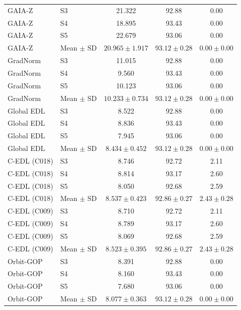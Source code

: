 \begin{longtable}{@{}llccc@{}}
GAIA-Z & S3 & 21.322 & 92.88 & 0.00 \\
GAIA-Z & S4 & 18.895 & 93.43 & 0.00 \\
GAIA-Z & S5 & 22.679 & 93.06 & 0.00 \\
GAIA-Z & Mean $\pm$ SD & $20.965 \pm 1.917$ & $93.12 \pm 0.28$ & $0.00 \pm 0.00$ \\
GradNorm & S3 & 11.015 & 92.88 & 0.00 \\
GradNorm & S4 & 9.560 & 93.43 & 0.00 \\
GradNorm & S5 & 10.123 & 93.06 & 0.00 \\
GradNorm & Mean $\pm$ SD & $10.233 \pm 0.734$ & $93.12 \pm 0.28$ & $0.00 \pm 0.00$ \\
Global EDL & S3 & 8.522 & 92.88 & 0.00 \\
Global EDL & S4 & 8.836 & 93.43 & 0.00 \\
Global EDL & S5 & 7.945 & 93.06 & 0.00 \\
Global EDL & Mean $\pm$ SD & $8.434 \pm 0.452$ & $93.12 \pm 0.28$ & $0.00 \pm 0.00$ \\
C-EDL (C018) & S3 & 8.746 & 92.72 & 2.11 \\
C-EDL (C018) & S4 & 8.814 & 93.17 & 2.60 \\
C-EDL (C018) & S5 & 8.050 & 92.68 & 2.59 \\
C-EDL (C018) & Mean $\pm$ SD & $8.537 \pm 0.423$ & $92.86 \pm 0.27$ & $2.43 \pm 0.28$ \\
C-EDL (C009) & S3 & 8.710 & 92.72 & 2.11 \\
C-EDL (C009) & S4 & 8.789 & 93.17 & 2.60 \\
C-EDL (C009) & S5 & 8.069 & 92.68 & 2.59 \\
C-EDL (C009) & Mean $\pm$ SD & $8.523 \pm 0.395$ & $92.86 \pm 0.27$ & $2.43 \pm 0.28$ \\
Orbit-GOP & S3 & 8.391 & 92.88 & 0.00 \\
Orbit-GOP & S4 & 8.160 & 93.43 & 0.00 \\
Orbit-GOP & S5 & 7.680 & 93.06 & 0.00 \\
Orbit-GOP & Mean $\pm$ SD & $8.077 \pm 0.363$ & $93.12 \pm 0.28$ & $0.00 \pm 0.00$ \\
\end{longtable}
\endgroup

\clearpage
